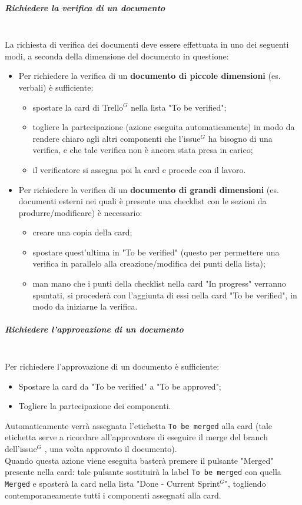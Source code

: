 \subparagraph{Richiedere la verifica di un documento}
\mbox{}\\
La richiesta di verifica dei documenti deve essere effettuata in uno dei seguenti modi,
a seconda della dimensione del documento in questione:
\begin{itemize}
    \item Per richiedere la verifica di un \textbf{documento di piccole dimensioni} (es. verbali) è sufficiente:
    \begin{itemize}
        \item spostare la card di Trello$^G$ nella lista "To be verified";
        \item togliere la partecipazione (azione eseguita automaticamente) in modo da rendere chiaro agli altri
        componenti che l'issue$^G$  ha bisogno di una verifica, e che tale verifica non è ancora stata presa in carico;
        \item il verificatore si assegna poi la card e procede con il lavoro.
    \end{itemize}
    \item Per richiedere la verifica di un \textbf{documento di grandi dimensioni} (es. documenti esterni nei quali è presente
    una checklist con le sezioni da produrre/modificare) è necessario:
    \begin{itemize}
        \item creare una copia della card;
        \item spostare quest'ultima in "To be verified" (questo per permettere una verifica in parallelo alla
        creazione/modifica dei punti della lista);
        \item man mano che i punti della checklist nella card "In progress" verranno spuntati, si procederà con
        l'aggiunta di essi nella card "To be verified", in modo da iniziarne la verifica.
    \end{itemize}
\end{itemize}

\subparagraph{Richiedere l'approvazione di un documento}
\mbox{}\\
Per richiedere l'approvazione di un documento è sufficiente:
\begin{itemize}
    \item Spostare la card da "To be verified" a "To be approved";
    \item Togliere la partecipazione dei componenti.
\end{itemize}
Automaticamente verrà assegnata l'etichetta \texttt{To be merged} alla card (tale etichetta serve a ricordare all'approvatore
di eseguire il merge del branch dell'issue$^G$ , una volta approvato il documento).\\
Quando questa azione viene eseguita basterà premere il pulsante "Merged" presente nella card: tale pulsante sostituirà la label
\texttt{To be merged} con quella \texttt{Merged} e sposterà la card nella lista "Done - Current Sprint$^G$", togliendo contemporaneamente tutti i
componenti assegnati alla card.

